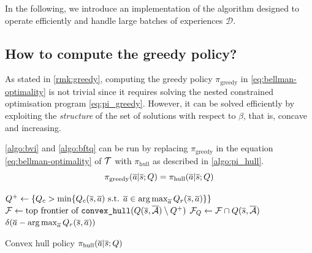 In the following, we introduce an implementation of the \BFTQ algorithm designed to operate efficiently and handle large batches of experiences $\mathcal{D}$.

\subsection{How to compute the greedy policy?}
\label{subsec:compute-greedy-policy}
As stated in \autoref{rmk:greedy}, computing the greedy policy $\pi_\text{greedy}$ in \eqref{eq:bellman-optimality} is not trivial since it requires solving the nested constrained optimisation program \eqref{eq:pi_greedy}. However, it can be solved efficiently by exploiting the \emph{structure} of the set of solutions with respect to $\beta$, that is, concave and increasing. 

\begin{proposition}
	\label{prop:bftq_pi_hull}
	\autoref{algo:bvi} and \autoref{algo:bftq} can be run by replacing $\pi_\text{greedy}$ in the equation \eqref{eq:bellman-optimality} of $\mathcal{T}$ with $\pi_\text{hull}$ as described in \autoref{algo:pi_hull}.
	\begin{equation*}
	\pi_\text{greedy}(\overline{a}|\overline{s}; Q) = \pi_\text{hull}(\overline{a}|\overline{s}; Q)
	\end{equation*}
\end{proposition}

\begin{algorithm}
	\DontPrintSemicolon
	$Q^+\leftarrow \{Q_c > \min \{Q_c(\overline{s},\overline{a}) \text{ s.t. }\overline{a}\in\operatorname*{arg\,max}_{\overline{a}} Q_r(\overline{s},\overline{a})\} \}$\;
	$\mathcal{F} \leftarrow \text{top frontier of }\texttt{convex\_hull}(Q(\overline{s},\overline{\mathcal{A}}) \setminus Q^+)$\;
	$\mathcal{F}_Q \leftarrow \mathcal{F}\cap Q(\overline{s},\overline{\mathcal{A}})$\;
	\Return $\delta(\overline{a} - \operatorname*{arg\,max}_{\overline{a}} Q_r(\overline{s},\overline{a}))$
	\caption{Convex hull policy $\pi_\text{hull}(\overline{a}|\overline{s}; Q)$}
	\label{algo:pi_hull}
\end{algorithm}

